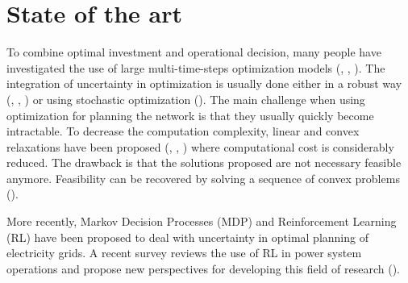 \section{State of the art}
\label{sec:stateart}

To combine optimal investment and operational decision, many people have investigated the use of large multi-time-steps optimization models (\cite{zonal_int}, \cite{Baker2012OptimalIO}, \cite{paolone}).
The integration of uncertainty in optimization is usually done either in a robust way (\cite{LorcaSun}, \cite{adaptative}, \cite{BM2}) or using stochastic optimization (\cite{Oren}).
The main challenge when using optimization for planning the network is that they usually quickly become intractable.
To decrease the computation complexity, linear and convex relaxations have been proposed (\cite{Farivar_Relax1}, \cite{Farivar_Relax2}, \cite{BM1}) where computational cost is considerably reduced.
The drawback is that the solutions proposed are not necessary feasible anymore.
Feasibility can be recovered by solving a sequence of convex problems (\cite{Nali}).

More recently, Markov Decision Processes (MDP) and Reinforcement Learning (RL) have been proposed to deal with uncertainty in optimal planning of electricity grids.
A recent survey reviews the use of RL in power system operations and propose new perspectives for developing this field of research (\cite{RLSurvey}).
